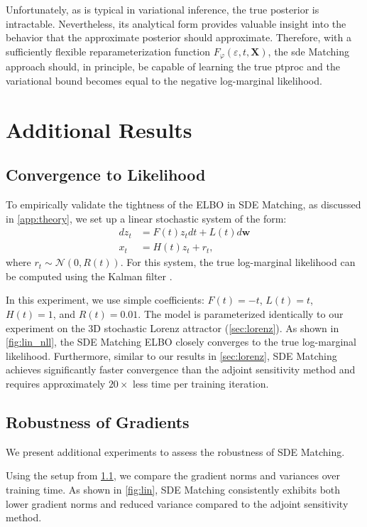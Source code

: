 \documentclass{article}
\def\N{\mathcal{N}}
\def\X{\mathbf{X}}
\def\w{\mathbf{w}}
\def\e{\varepsilon}
\def\ph{\varphi}
\theoremstyle{plain}
\theoremstyle{definition}
\theoremstyle{remark}
\begin{document}
Unfortunately, as is typical in variational inference, the true posterior is intractable. Nevertheless, its analytical form provides valuable insight into the behavior that the approximate posterior should approximate. Therefore, with a sufficiently flexible reparameterization function $F_\ph(\e, t, \X)$, the \gls{sde} Matching approach should, in principle, be capable of learning the true \gls{ptproc} and the variational bound becomes equal to the negative log-marginal likelihood.


\section{Additional Results}
\label{app:additional}


\subsection{Convergence to Likelihood}
\label{app:convergence}


To empirically validate the tightness of the ELBO in SDE Matching, as discussed in \cref{app:theory}, we set up a linear stochastic system of the form:
\begin{align}
    d z_t &= F(t) z_t dt + L(t) d\w \\
    x_t &= H(t) z_t + r_t,
\end{align}
where $r_t \sim \N(0, R(t))$. For this system, the true log-marginal likelihood can be computed using the Kalman filter \citep{sarkka2019applied}.


In this experiment, we use simple coefficients: $F(t) = -t$, $L(t) = t$, $H(t) = 1$, and $R(t) = 0.01$. The model is parameterized identically to our experiment on the 3D stochastic Lorenz attractor (\cref{sec:lorenz}). As shown in \cref{fig:lin_nll}, the SDE Matching ELBO closely converges to the true log-marginal likelihood. Furthermore, similar to our results in \cref{sec:lorenz}, SDE Matching achieves significantly faster convergence than the adjoint sensitivity method and requires approximately $20 \times$ less time per training iteration.


\subsection{Robustness of Gradients}
\label{app:grads}


We present additional experiments to assess the robustness of SDE Matching.


Using the setup from \cref{app:convergence}, we compare the gradient norms and variances over training time. As shown in \cref{fig:lin}, SDE Matching consistently exhibits both lower gradient norms and reduced variance compared to the adjoint sensitivity method.
\end{document}

